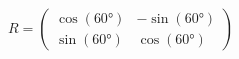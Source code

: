 \documentclass[preview]{standalone}
\begin{document}
\begin{align*}
R = \begin{pmatrix} \cos(60°) & -\sin(60°) \\ \sin(60°) & \cos(60°) \end{pmatrix}
\end{align*}
\end{document}

